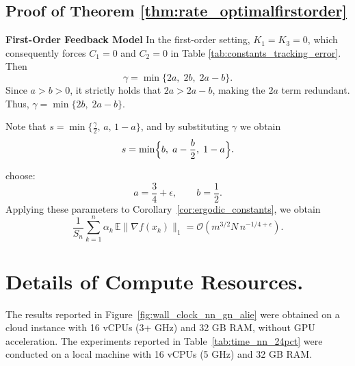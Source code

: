 \documentclass{article}
\begin{document}
\subsection{Proof of Theorem \ref{thm:rate_optimalfirstorder}}

\textbf{First-Order Feedback Model}
In the first-order setting,  $K_1 = K_3 = 0$, which consequently forces $C_1 = 0$ and $C_2 = 0$ in Table \ref{tab:constants_tracking_error}. Then 
$$
\gamma = \min\{2a,\; 2b,\; 2a-b\}.
$$
Since $a > b > 0$, it strictly holds that $2a > 2a-b$, making the $2a$ term redundant. Thus, $\gamma = \min\{2b,\; 2a-b\}$. 

Note that $s = \min\bigl\{\frac{\gamma}{2},\, a,\, 1-a\bigr\}$, and by substituting $\gamma$ we obtain
$$
s = \min\Bigl\{b,\; a-\frac{b}{2},\; 1-a\Bigr\}.
$$

 choose:
$$
a = \frac{3}{4} + \epsilon, \qquad b = \frac{1}{2}.
$$
 Applying these  parameters to Corollary~\ref{cor:ergodic_constants}, we obtain
$$
\frac{1}{S_n}\sum_{k=1}^n \alpha_k\,\mathbb{E}\|\nabla f(x_k)\|_1 = \mathcal{O}\!\left(m^{3/2}N\,n^{-1/4+\epsilon}\right).
$$

\section{Details of Compute Resources.} \label{expsetup} 
The results reported in Figure~\ref{fig:wall_clock_nn_gn_alie} were obtained on a cloud instance with 16 vCPUs (3+ GHz) and 32 GB RAM, without GPU acceleration. The experiments reported in Table~\ref{tab:time_nn_24pct} were conducted on a local machine with 16 vCPUs (5 GHz) and 32 GB RAM.
\end{document}
